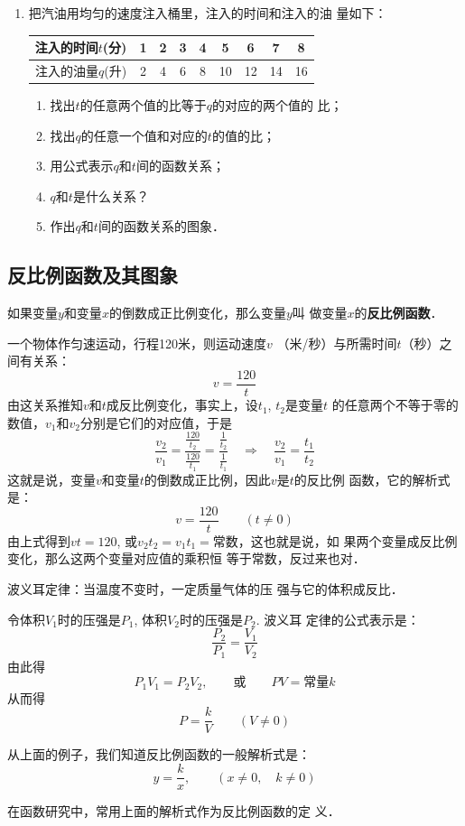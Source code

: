 \begin{enumerate}
\item 把汽油用均匀的速度注入桶里，注入的时间和注入的油
量如下：
\begin{center}
\begin{tabular}{c|cccccccc}
    \hline
    注入的时间$t$(分)&1&2&3&4&5&6&7&8\\
   \hline
注入的油量$q$(升)   &2&4&6&8&10&12&14&16\\
   \hline
\end{tabular}
\end{center}
\begin{enumerate}
    \item 找出$t$的任意两个值的比等于$q$的对应的两个值的
    比；
    \item 找出$q$的任意一个值和对应的$t$的值的比；
    \item 用公式表示$q$和$t$间的函数关系；
    \item $q$和$t$是什么关系？
    \item 作出$q$和$t$间的函数关系的图象．
\end{enumerate}
\end{enumerate}


\subsection{反比例函数及其图象}
如果变量$y$和变量$x$的倒数成正比例变化，那么变量$y$叫
做变量$x$的\textbf{反比例函数}．


\begin{example}
    一个物体作匀速运动，行程120米，则运动速度$v$
（米/秒）与所需时间$t$（秒）之间有关系：
\[v=\frac{120}{t}\]
由这关系推知$v$和$t$成反比例变化，事实上，设$t_1$, $t_2$是变量$t$
的任意两个不等于零的数值，$v_1$和$v_2$分别是它们的对应值，于是
\[\frac{v_2}{v_1}=\frac{\frac{120}{t_2}}{\frac{120}{t_1}}=\frac{\frac{1}{t_2}}{\frac{1}{t_1}}\quad \Rightarrow\quad \frac{v_2}{v_1}=\frac{t_1}{t_2}\]
这就是说，变量$v$和变量$t$的倒数成正比例，因此$v$是$t$的反比例
函数，它的解析式是：
\[v=\frac{120}{t}\qquad (t\ne 0)\]
由上式得到$vt=120$, 或$v_2t_2=v_1t_1=$常数，这也就是说，如
果两个变量成反比例变化，那么这两个变量对应值的乘积恒
等于常数，反过来也对．
\end{example}


\begin{example}
    波义耳定律：当温度不变时，一定质量气体的压
强与它的体积成反比．

令体积$V_1$时的压强是$P_1$, 体积$V_2$时的压强是$P_2$. 波义耳
定律的公式表示是：
\[\frac{P_2}{P_1}=\frac{V_1}{V_2}\]
由此得
\[P_1V_1=P_2V_2,\qquad \text{或}\qquad PV=\text{常量}k\]
从而得
\[P=\frac{k}{V}\qquad (V\ne 0)\]

从上面的例子，我们知道反比例函数的一般解析式是：
\[y=\frac{k}{x},\qquad (x\ne 0,\quad k\ne 0)\]

在函数研究中，常用上面的解析式作为反比例函数的定
义．
\end{example}

